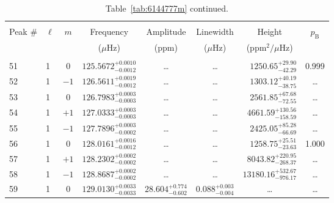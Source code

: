 \begin{table*}[!]
\caption{Table~\ref{tab:6144777m} continued.}
\label{tab:6144777m2}
\centering
\begin{tabular}{llcrrlrc}
\hline\hline
\\[-8pt]          
Peak \# & $\ell$ & $m$ & \multicolumn{1}{c}{Frequency} & \multicolumn{1}{c}{Amplitude} & \multicolumn{1}{c}{Linewidth} & \multicolumn{1}{c}{Height}& $p_\mathrm{B}$\\
 & & & \multicolumn{1}{c}{($\mu$Hz)} & \multicolumn{1}{c}{(ppm)} & \multicolumn{1}{c}{($\mu$Hz)} & \multicolumn{1}{c}{(ppm$^2/\mu$Hz)}\\
\hline \\[-8pt]
51 & 1 & 0 & $    125.5672_{-      0.0012}^{+      0.0010}$ & \multicolumn{1}{c}{\dots} & \multicolumn{1}{c}{\dots} & $     1250.65_{-       42.29}^{+       29.90}$ & 0.999\\[1pt]
52 & 1 & $-1$ & $    126.5611_{-      0.0012}^{+      0.0019}$ & \multicolumn{1}{c}{\dots} & \multicolumn{1}{c}{\dots} & $     1303.12_{-       38.75}^{+       40.19}$ & \dots\\[1pt]
53 & 1 & 0 & $    126.7983_{-      0.0003}^{+      0.0003}$ & \multicolumn{1}{c}{\dots} & \multicolumn{1}{c}{\dots} & $     2561.85_{-       72.55}^{+       67.68}$ & \dots\\[1pt]
54 & 1 & $+1$ & $    127.0333_{-      0.0003}^{+      0.0003}$ & \multicolumn{1}{c}{\dots} & \multicolumn{1}{c}{\dots} & $     4661.59_{-      158.59}^{+      130.56}$ & \dots\\[1pt]
55 & 1 & $-1$ & $    127.7896_{-      0.0002}^{+      0.0003}$ & \multicolumn{1}{c}{\dots} & \multicolumn{1}{c}{\dots} & $     2425.05_{-       66.69}^{+       85.28}$ & \dots\\[1pt]
56 & 1 & 0 & $    128.0161_{-      0.0012}^{+      0.0016}$ & \multicolumn{1}{c}{\dots} & \multicolumn{1}{c}{\dots} & $     1258.75_{-       23.63}^{+       25.51}$ & 1.000\\[1pt]
57 & 1 & $+1$ & $    128.2302_{-      0.0002}^{+      0.0002}$ & \multicolumn{1}{c}{\dots} & \multicolumn{1}{c}{\dots} & $     8043.82_{-      268.37}^{+      220.95}$ & \dots\\[1pt]
58 & 1 & $-1$ & $    128.8687_{-      0.0002}^{+      0.0002}$ & \multicolumn{1}{c}{\dots} & \multicolumn{1}{c}{\dots} & $    13180.16_{-      976.17}^{+      532.67}$ & \dots\\[1pt]
59 & 1 & 0 & $    129.0130_{-      0.0033}^{+      0.0033}$ & $      28.604_{-       0.602}^{+       0.774}$ & $       0.088_{-       0.004}^{+       0.003}$ & \multicolumn{1}{c}{\dots} & \dots\\[1pt]

\end{tabular}
\end{table*}

